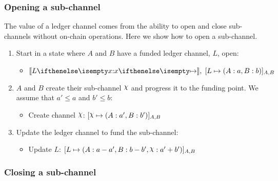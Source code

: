 \documentclass{article}
\begin{document}
\subsubsection{Opening a sub-channel}

The value of a ledger channel comes from the ability to open and close sub-channels without on-chain operations.
Here we show how to open a sub-channel.
\begin{enumerate}
  \item Start in a state where $A$ and $B$ have a funded ledger channel, $L$, open:
  \begin{itemize}
    \item $\adj{\holds{L}{x}{}}, \; \finalizable{L}{\alloc{A: a, B: b}}{A, B}$
  \end{itemize}
  \item $A$ and $B$ create their sub-channel $\rchi$ and progress it to the funding point. We assume that $a' \leq a$ and $b' \leq b$:
  \begin{itemize}
    \item Create channel $\rchi$: $\finalizable{\rchi}{\alloc{A:a', B:b'}}{A,B}$
  \end{itemize}
  \item Update the ledger channel to fund the sub-channel:
  \begin{itemize}
    \item Update $L$: $\finalizable{L}{\alloc{A:a-a', B: b - b', \rchi: a' + b'}}{A,B}$
  \end{itemize}
\end{enumerate}

\subsubsection{Closing a sub-channel}
\end{document}
